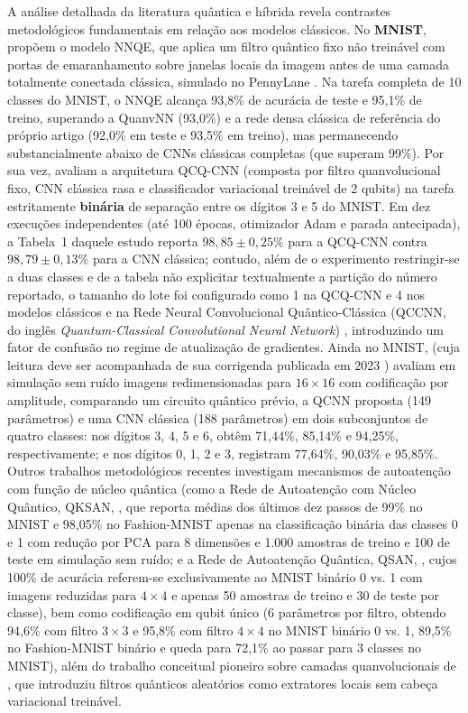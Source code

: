 \documentclass[
    12pt,
    openright,
    oneside,
    a4paper,
    english,
    brazil
]{abntex2}
\begin{document}
A análise detalhada da literatura quântica e híbrida revela contrastes metodológicos fundamentais em relação aos modelos clássicos. No \textbf{MNIST},  propõem o modelo NNQE, que aplica um filtro quântico fixo não treinável com portas de emaranhamento sobre janelas locais da imagem antes de uma camada totalmente conectada clássica, simulado no PennyLane \cite{bergholm2018pennylane}. Na tarefa completa de 10 classes do MNIST, o NNQE alcança 93,8\% de acurácia de teste e 95,1\% de treino, superando a QuanvNN (93,0\%) e a rede densa clássica de referência do próprio artigo (92,0\% em teste e 93,5\% em treino), mas permanecendo substancialmente abaixo de CNNs clássicas completas (que superam 99\%). Por sua vez,  avaliam a arquitetura QCQ-CNN (composta por filtro quanvolucional fixo, CNN clássica rasa e classificador variacional treinável de 2 qubits) na tarefa estritamente \textbf{binária} de separação entre os dígitos 3 e 5 do MNIST. Em dez execuções independentes (até 100 épocas, otimizador Adam e parada antecipada), a Tabela~1 daquele estudo reporta \(98{,}85 \pm 0{,}25\%\) para a QCQ-CNN contra \(98{,}79 \pm 0{,}13\%\) para a CNN clássica; contudo, além de o experimento restringir-se a duas classes e de a tabela não explicitar textualmente a partição do número reportado, o tamanho do lote foi configurado como 1 na QCQ-CNN e 4 nos modelos clássicos e na Rede Neural Convolucional Quântico-Clássica (QCCNN, do inglês \textit{Quantum-Classical Convolutional Neural Network}) \cite{long2025qcqcnn}, introduzindo um fator de confusão no regime de atualização de gradientes. Ainda no MNIST,  (cuja leitura deve ser acompanhada de sua corrigenda publicada em 2023 \cite{bokhan2022corrigendum}) avaliam em simulação sem ruído imagens redimensionadas para \(16 \times 16\) com codificação por amplitude, comparando um circuito quântico prévio, a QCNN proposta (149 parâmetros) e uma CNN clássica (188 parâmetros) em dois subconjuntos de quatro classes: nos dígitos 3, 4, 5 e 6, obtêm 71,44\%, 85,14\% e 94,25\%, respectivamente; e nos dígitos 0, 1, 2 e 3, registram 77,64\%, 90,03\% e 95,85\%. Outros trabalhos metodológicos recentes investigam mecanismos de autoatenção com função de núcleo quântica (como a Rede de Autoatenção com Núcleo Quântico, QKSAN, \cite{zhao2024qksan}, que reporta médias dos últimos dez passos de 99\% no MNIST e 98,05\% no Fashion-MNIST apenas na classificação binária das classes 0 e 1 com redução por PCA para 8 dimensões e 1.000 amostras de treino e 100 de teste em simulação sem ruído; e a Rede de Autoatenção Quântica, QSAN, \cite{shi2025qsan}, cujos 100\% de acurácia referem-se exclusivamente ao MNIST binário 0 vs. 1 com imagens reduzidas para \(4 \times 4\) e apenas 50 amostras de treino e 30 de teste por classe), bem como codificação em qubit único \cite{easommccaldin2024singlequbit} (6 parâmetros por filtro, obtendo 94,6\% com filtro \(3 \times 3\) e 95,8\% com filtro \(4 \times 4\) no MNIST binário 0 vs. 1, 89,5\% no Fashion-MNIST binário e queda para 72,1\% ao passar para 3 classes no MNIST), além do trabalho conceitual pioneiro sobre camadas quanvolucionais de , que introduziu filtros quânticos aleatórios como extratores locais sem cabeça variacional treinável.
\end{document}

